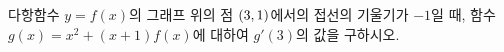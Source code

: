 다항함수 $y=f(x)$의 그래프 위의 점 $(3{,}\mkern3mu\mathopen{}1)$에서의 접선의 기울기가 $-1$일 때, 함수 $g(x)=x^2+(x+1)f(x)$에 대하여 $g'(3)$의 값을 구하시오.
